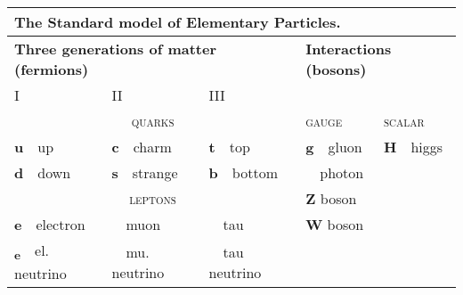 \documentclass[
	raggedright,
	12pt,
	colorful,
]{tufte-style-article}
\begin{document}
\begin{table}[!htb]\small
{}
\begin{tabular}{lllll}
	\multicolumn{5}{l}{\textbf{The Standard model of Elementary Particles.}}\\
	\toprule
	\multicolumn{3}{l}{\textbf{Three generations of matter (fermions)}} & \multicolumn{2}{l}{\textbf{Interactions (bosons)}} \\
	I & II & III & & \\
	\multicolumn{3}{c}{\textsc{quarks}} & \textsc{gauge} & \textsc{scalar} \\
	\cmidrule(lr){1-3}\cmidrule(lr){4-4}\cmidrule(lr){5-5}
	\textbf{u}~~up & \textbf{c}~~charm & \textbf{t}~~top & \textbf{g}~~gluon & \textbf{H}~~higgs \\
	\textbf{d}~~down & \textbf{s}~~strange & \textbf{b}~~bottom & \textbf{\textgamma}~~photon & \\
	\multicolumn{3}{c}{\textsc{leptons}} & \textbf{Z} boson  & \\
	\cmidrule(lr){1-3}
	\textbf{e}~~electron & \textbf{\textmu}~~muon & \textbf{\texttau}~~tau & \textbf{W} boson & \\
	\textbf{\textnu\textsubscript{e}}~~el. neutrino & \textbf{\textnu\textsubscript{\textmu}}~~mu. neutrino & \textbf{\textnu\textsubscript{\texttau}}~~tau neutrino &  & \\
	\bottomrule
\end{tabular}
\end{table}
\end{document}
